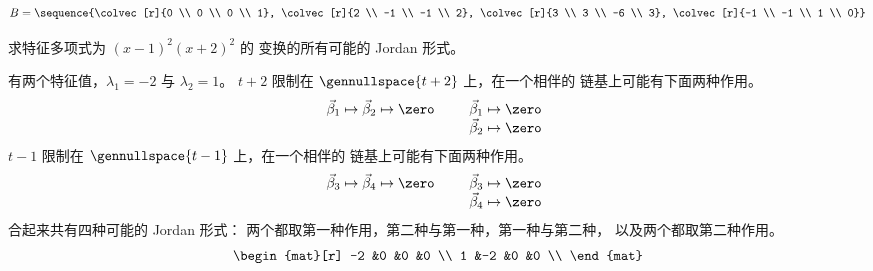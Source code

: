 \begin{exercises}
\begin{answer}
\begin{exparts}
\begin{equation*}
              B=\sequence{\colvec[r]{0 \\ 0 \\ 0 \\ 1},
                          \colvec[r]{2 \\ -1 \\ -1 \\ 2},
                          \colvec[r]{3 \\ 3 \\ -6 \\ 3},
                          \colvec[r]{-1 \\ -1 \\ 1 \\ 0}}
            \end{equation*}
      \end{exparts}  
    \end{answer}
  \recommended \item
    求特征多项式为 \( (x-1)^2(x+2)^2  \) 的
    变换的所有可能的 Jordan 形式。
    \begin{answer}
      有两个特征值，$\lambda_1=-2$ 与 $\lambda_2=1$。
      $t+2$ 限制在
      $\gennullspace{t+2}$ 上，在一个相伴的
      链基上可能有下面两种作用。
      \begin{equation*}
        \vec{\beta}_1\mapsto\vec{\beta}_2\mapsto\zero
        \qquad
        \begin{array}[t]{l}
          \vec{\beta}_1\mapsto\zero  \\
          \vec{\beta}_2\mapsto\zero 
        \end{array}
      \end{equation*}
      $t-1$ 限制在
      $\gennullspace{t-1}$ 上，在一个相伴的
      链基上可能有下面两种作用。
      \begin{equation*}
        \vec{\beta}_3\mapsto\vec{\beta}_4\mapsto\zero
        \qquad
        \begin{array}[t]{l}
          \vec{\beta}_3\mapsto\zero  \\
          \vec{\beta}_4\mapsto\zero 
        \end{array}
      \end{equation*}
      合起来共有四种可能的 Jordan 形式：
      两个都取第一种作用，第二种与第一种，第一种与第二种，
      以及两个都取第二种作用。
      \begin{equation*}
        \begin{mat}[r]
          -2  &0  &0  &0  \\
           1  &-2 &0  &0  \\

\end{mat}
\end{equation*}
\end{answer}
\end{exercises}
